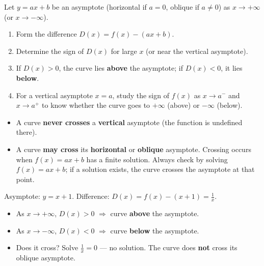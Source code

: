 \documentclass[11pt]{article}
\begin{document}
\begin{methode}
Let $y = ax + b$ be an asymptote (horizontal if $a=0$, oblique if $a\neq0$) as $x \to +\infty$ (or $x \to -\infty$).
\begin{enumerate}
\item Form the difference $D(x) = f(x) - (ax + b)$.
\item Determine the sign of $D(x)$ for large $x$ (or near the vertical asymptote).
\item If $D(x) > 0$, the curve lies \textbf{above} the asymptote; if $D(x) < 0$, it lies \textbf{below}.
\item For a vertical asymptote $x = a$, study the sign of $f(x)$ as $x \to a^-$ and $x \to a^+$ to know whether the curve goes to $+\infty$ (above) or $-\infty$ (below).
\end{enumerate}
\end{methode}

\begin{attention}
\begin{itemize}
\item A curve \textbf{never crosses} a \textbf{vertical} asymptote (the function is undefined there).
\item A curve \textbf{may cross} its \textbf{horizontal} or \textbf{oblique} asymptote. Crossing occurs when $f(x) = ax + b$ has a finite solution. Always check by solving $f(x) = ax + b$; if a solution exists, the curve crosses the asymptote at that point.
\end{itemize}
\end{attention}

\begin{exemplebox}[Position and crossing for $f(x) = \frac{x^2+x+1}{x}$]
Asymptote: $y = x + 1$.
Difference: $D(x) = f(x) - (x+1) = \frac{1}{x}$.
\begin{itemize}
\item As $x \to +\infty$, $D(x) > 0$ $\Rightarrow$ curve \textbf{above} the asymptote.
\item As $x \to -\infty$, $D(x) < 0$ $\Rightarrow$ curve \textbf{below} the asymptote.
\item Does it cross? Solve $\frac{1}{x} = 0$ — no solution. The curve does \textbf{not} cross its oblique asymptote.
\end{itemize}
\end{exemplebox}
\end{document}
